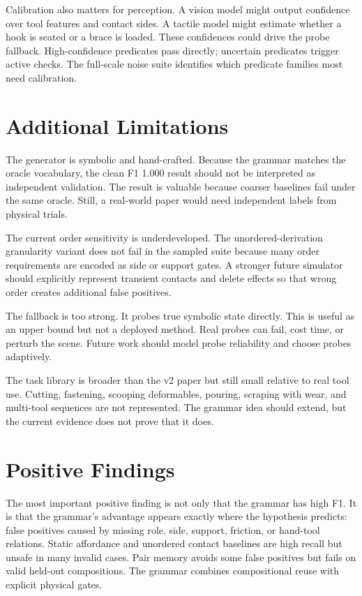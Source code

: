 \documentclass{article}
\begin{document}
Calibration also matters for perception. A vision model might output confidence over tool features and contact sides. A tactile model might estimate whether a hook is seated or a brace is loaded. These confidences could drive the probe fallback. High-confidence predicates pass directly; uncertain predicates trigger active checks. The full-scale noise suite identifies which predicate families most need calibration.

\section{Additional Limitations}

The generator is symbolic and hand-crafted. Because the grammar matches the oracle vocabulary, the clean F1 1.000 result should not be interpreted as independent validation. The result is valuable because coarser baselines fail under the same oracle. Still, a real-world paper would need independent labels from physical trials.

The current order sensitivity is underdeveloped. The unordered-derivation granularity variant does not fail in the sampled suite because many order requirements are encoded as side or support gates. A stronger future simulator should explicitly represent transient contacts and delete effects so that wrong order creates additional false positives.

The fallback is too strong. It probes true symbolic state directly. This is useful as an upper bound but not a deployed method. Real probes can fail, cost time, or perturb the scene. Future work should model probe reliability and choose probes adaptively.

The task library is broader than the v2 paper but still small relative to real tool use. Cutting, fastening, scooping deformables, pouring, scraping with wear, and multi-tool sequences are not represented. The grammar idea should extend, but the current evidence does not prove that it does.

\section{Positive Findings}

The most important positive finding is not only that the grammar has high F1. It is that the grammar's advantage appears exactly where the hypothesis predicts: false positives caused by missing role, side, support, friction, or hand-tool relations. Static affordance and unordered contact baselines are high recall but unsafe in many invalid cases. Pair memory avoids some false positives but fails on valid held-out compositions. The grammar combines compositional reuse with explicit physical gates.
\end{document}
